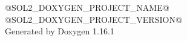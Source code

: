 \documentclass[twoside]{book}
\newcommand{\+}{\discretionary{\mbox{\scriptsize$\hookleftarrow$}}{}{}}
\newcommand{\clearemptydoublepage}{%
    \newpage{\pagestyle{empty}\cleardoublepage}%
  }
\begin{document}
  \raggedbottom
    \hypersetup{pageanchor=false,
                bookmarksnumbered=true,
                pdfencoding=unicode
               }
  \begin{titlepage}
  \vspace*{7cm}
  \begin{center}%
  {\Large @\+SOL2\+\_\+\+DOXYGEN\+\_\+\+PROJECT\+\_\+\+NAME@}\\
  [1ex]\large @\+SOL2\+\_\+\+DOXYGEN\+\_\+\+PROJECT\+\_\+\+VERSION@ \\
  \vspace*{1cm}
  {\large Generated by Doxygen 1.16.1}\\
  \end{center}
  \end{titlepage}
  \clearemptydoublepage
  \tableofcontents
  \clearemptydoublepage
  \hypersetup{pageanchor=true}
  \backmatter
  \newpage
  \clearemptydoublepage
  \printindex
\end{document}

